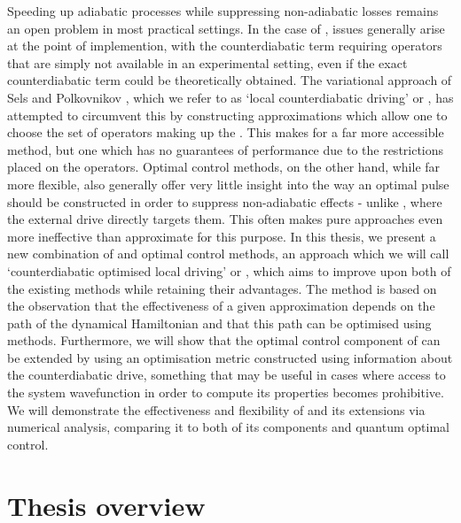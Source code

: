 Speeding up adiabatic processes while suppressing non-adiabatic losses remains an open problem in most practical settings. In the case of , issues generally arise at the point of implemention, with the counterdiabatic term requiring operators that are simply not available in an experimental setting, even if the exact counterdiabatic term could be theoretically obtained. The variational approach of Sels and Polkovnikov \cite{sels_minimizing_2017}, which we refer to as `local counterdiabatic driving' or , has attempted to circumvent this by constructing approximations which allow one to choose the set of operators making up the . This makes for a far more accessible method, but one which has no guarantees of performance due to the restrictions placed on the operators. Optimal control methods, on the other hand, while far more flexible, also generally offer very little insight into the way an optimal pulse should be constructed in order to suppress non-adiabatic effects - unlike , where the external drive directly targets them. This often makes pure  approaches even more ineffective than approximate  for this purpose. In this thesis, we present a new combination of  and optimal control methods, an approach which we will call `counterdiabatic optimised local driving' or  \cite{cepaite_counterdiabatic_2023}, which aims to improve upon both of the existing methods while retaining their advantages. The method is based on the observation that the effectiveness of a given  approximation depends on the path of the dynamical Hamiltonian and that this path can be optimised using  methods. Furthermore, we will show that the optimal control component of  can be extended by using an optimisation metric constructed using information about the counterdiabatic drive, something that may be useful in cases where access to the system wavefunction in order to compute its properties becomes prohibitive. We will demonstrate the effectiveness and flexibility of  and its extensions via numerical analysis, comparing it to both of its components  and quantum optimal control.

\section{Thesis overview}

